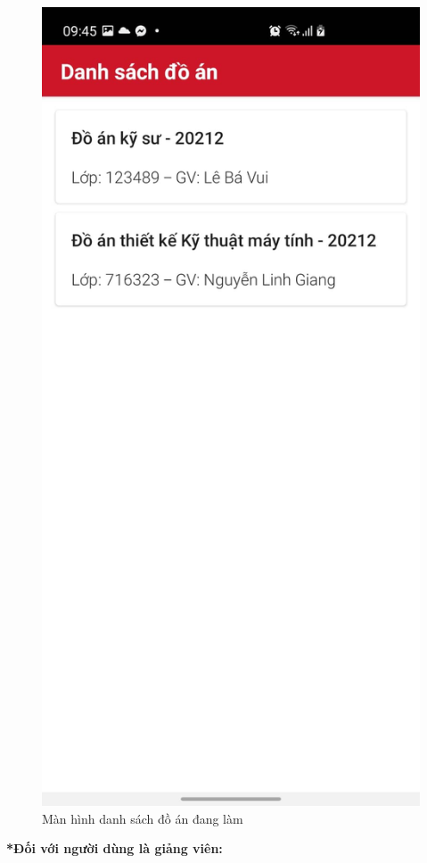 \documentclass[../Main.tex]{subfiles}
\begin{document}
\begin{figure}[H]
\begin{minipage}{0.5\textwidth}
\includegraphics[width=0.60\linewidth]{Figure/screen/ds_project.jpeg}
\caption{Màn hình danh sách đồ án đang làm} \label{fig:list_task}
\end{minipage}
\end{figure}


\textbf{*Đối với người dùng là giảng viên:}
\end{document}
